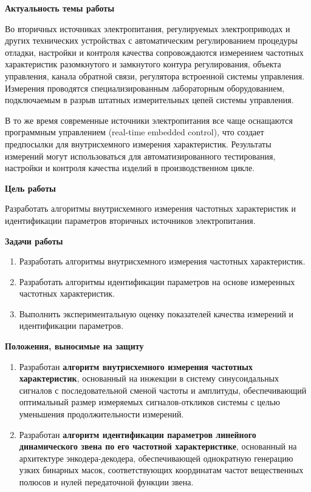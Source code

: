 
\textbf{Актуальность темы работы}\par
Во вторичных источниках электропитания, регулируемых электроприводах и других технических устройствах с автоматическим регулированием процедуры отладки, настройки и контроля качества сопровождаются измерением частотных характеристик разомкнутого и замкнутого контура регулирования, объекта управления, канала обратной связи, регулятора встроенной системы управления. Измерения проводятся специализированным лабораторным оборудованием, подключаемым в разрыв штатных измерительных цепей системы управления.

В то же время современные источники электропитания все чаще оснащаются программным управлением (real-time embedded control), что создает предпосылки для внутрисхемного измерения характеристик. Результаты измерений могут использоваться для автоматизированного тестирования, настройки и контроля качества изделий в производственном цикле.

\textbf{Цель работы}\par
Разработать алгоритмы внутрисхемного измерения частотных характеристик и идентификации параметров вторичных источников электропитания.

\textbf{Задачи работы}\par
\begin{enumerate}
    \item Разработать алгоритмы внутрисхемного измерения частотных характеристик.
    \item Разработать алгоритмы идентификации параметров на основе измеренных частотных характеристик.
    \item Выполнить экспериментальную оценку показателей качества измерений и идентификации параметров.
\end{enumerate}

\textbf{Положения, выносимые на защиту}\par
\begin{enumerate}
    \item Разработан \textbf{алгоритм внутрисхемного измерения частотных характеристик}, основанный на инжекции в систему синусоидальных сигналов с последовательной сменой частоты и амплитуды, обеспечивающий оптимальный размер измеряемых сигналов-откликов системы с целью уменьшения продолжительности измерений.

    \item Разработан \textbf{алгоритм идентификации параметров линейного динамического звена по его частотной характеристике}, основанный на архитектуре энкодера-декодера, обеспечивающей однократную генерацию узких бинарных масок, соответствующих координатам частот вещественных полюсов и нулей передаточной функции звена.
\end{enumerate}

